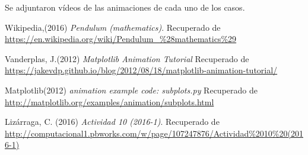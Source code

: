 \documentclass[12pt]{article}
\begin{document}
Se adjuntaron vídeos de las animaciones de cada uno de los casos.
\pagebreak

\begin{thebibliography}{6}
	Wikipedia,(2016)
	\emph{Pendulum (mathematics)}. Recuperado de \url{https://en.wikipedia.org/wiki/Pendulum\_\%28mathematics\%29}

	Vanderplas, J.(2012)
	\emph{Matplotlib Animation Tutorial} Recuperado de \url{https://jakevdp.github.io/blog/2012/08/18/matplotlib-animation-tutorial/}

	Matplotlib(2012)
	\emph{animation example code: subplots.py} Recuperado de \url{http://matplotlib.org/examples/animation/subplots.html}

Lizárraga, C. (2016)
\emph{Actividad 10 (2016-1)}. Recuperado de \url{http://computacional1.pbworks.com/w/page/107247876/Actividad\%2010\%20(2016-1)}
\end{thebibliography}
\end{document}
